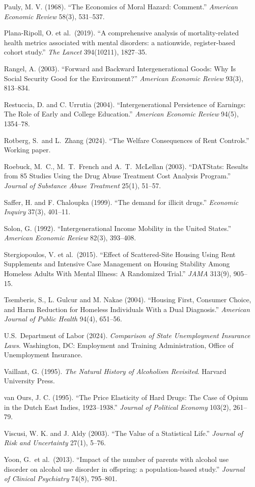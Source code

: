 \documentclass[10pt]{article}
\begin{document}
{\begin{list}{}{\setlength{\leftmargin}{1.5em}\setlength{\itemindent}{-1.5em}\setlength{\itemsep}{0.35em}\setlength{\parsep}{0em}}
\item Pauly, M. V. (1968). ``The Economics of Moral Hazard: Comment.'' \emph{American Economic Review} 58(3), 531--537.
\item Plana-Ripoll, O. et al.\ (2019). ``A comprehensive analysis of mortality-related health metrics associated with mental disorders: a nationwide, register-based cohort study.'' \emph{The Lancet} 394(10211), 1827--35.
\item Rangel, A. (2003). ``Forward and Backward Intergenerational Goods: Why Is Social Security Good for the Environment?'' \emph{American Economic Review} 93(3), 813--834.
\item Restuccia, D. and C. Urrutia (2004). ``Intergenerational Persistence of Earnings: The Role of Early and College Education.'' \emph{American Economic Review} 94(5), 1354--78.
\item Rotberg, S.\ and L.\ Zhang (2024). ``The Welfare Consequences of Rent Controls.'' Working paper.
\item Roebuck, M.\ C., M.\ T.\ French and A.\ T.\ McLellan (2003). ``DATStats: Results from 85 Studies Using the Drug Abuse Treatment Cost Analysis Program.'' \emph{Journal of Substance Abuse Treatment} 25(1), 51--57.
\item Saffer, H. and F. Chaloupka (1999). ``The demand for illicit drugs.'' \emph{Economic Inquiry} 37(3), 401--11.
\item Solon, G. (1992). ``Intergenerational Income Mobility in the United States.'' \emph{American Economic Review} 82(3), 393--408.
\item Stergiopoulos, V. et al.\ (2015). ``Effect of Scattered-Site Housing Using Rent Supplements and Intensive Case Management on Housing Stability Among Homeless Adults With Mental Illness: A Randomized Trial.'' \emph{JAMA} 313(9), 905--15.
\item Tsemberis, S., L. Gulcur and M. Nakae (2004). ``Housing First, Consumer Choice, and Harm Reduction for Homeless Individuals With a Dual Diagnosis.'' \emph{American Journal of Public Health} 94(4), 651--56.
\item U.S.\ Department of Labor (2024). \emph{Comparison of State Unemployment
Insurance Laws}. Washington, DC: Employment and Training Administration, Office of
Unemployment Insurance.
\item Vaillant, G. (1995). \emph{The Natural History of Alcoholism Revisited}. Harvard University Press.
\item van Ours, J. C. (1995). ``The Price Elasticity of Hard Drugs: The Case of Opium in the Dutch East Indies, 1923--1938.'' \emph{Journal of Political Economy} 103(2), 261--79.
\item Viscusi, W. K. and J. Aldy (2003). ``The Value of a Statistical Life.'' \emph{Journal of Risk and Uncertainty} 27(1), 5--76.
\item Yoon, G.\ et al.\ (2013). ``Impact of the number of parents with alcohol use disorder on alcohol use disorder in offspring: a population-based study.'' \emph{Journal of Clinical Psychiatry} 74(8), 795--801.
\end{list}

}
\end{document}
